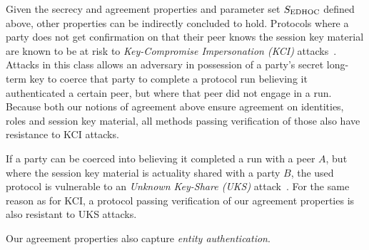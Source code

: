{%
Given the secrecy and agreement properties and parameter set $S_{\text{EDHOC}}$ defined
above, other properties can be indirectly concluded to hold.
%
Protocols where a party does not get confirmation on that their peer knows the
session key material are known to be at risk to
\emph{Key-Compromise Impersonation (KCI)}
attacks~\cite{DBLP:conf/ima/Blake-WilsonJM97}.
%
Attacks in this class allows an adversary in possession of a party's secret
long-term key to coerce that party to complete a
protocol run believing it authenticated a certain peer, but where that peer did
not engage in a run.
%
Because both our notions of agreement above ensure agreement on identities,
roles and session key material, all methods passing verification of those also
have resistance to KCI attacks.
%

If a party can be coerced into believing it completed a run with a peer $A$, but
where the session key material is actuality shared with a party $B$, the used
protocol is vulnerable to an \emph{Unknown Key-Share (UKS)}
attack~\cite{DBLP:conf/ima/Blake-WilsonJM97}.
%
For the same reason as for KCI, a protocol passing verification of our agreement
properties is also resistant to UKS attacks.
%

Our agreement properties also capture \emph{entity authentication}.
%


%
%

%

}
